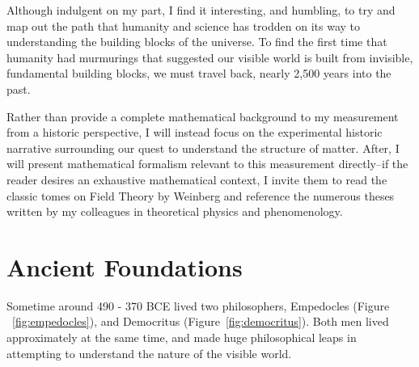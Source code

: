 Although indulgent on my part, I find it interesting, and humbling, to try and
map out the path that humanity and science has trodden on its way to
understanding the building blocks of the universe. To find the first time that
humanity had murmurings that suggested our visible world is built from
invisible, fundamental building blocks, we must travel back, nearly 2,500 years
into the past.

Rather than provide a complete mathematical background to my measurement from a
historic perspective, I will instead focus on the experimental historic
narrative surrounding our quest to understand the structure of matter. After, I
will present mathematical formalism relevant to this measurement directly--if
the reader desires an exhaustive mathematical context, I invite them to read the
classic tomes on Field Theory by Weinberg and reference the numerous theses
written by my colleagues in theoretical physics and phenomenology.

\section{Ancient Foundations}
Sometime around 490 - 370 BCE lived two philosophers, Empedocles (Figure
~\ref{fig:empedocles}), and Democritus (Figure~\ref{fig:democritus}). Both men
lived approximately at the same time, and made huge philosophical leaps in
attempting to understand the nature of the visible world.


